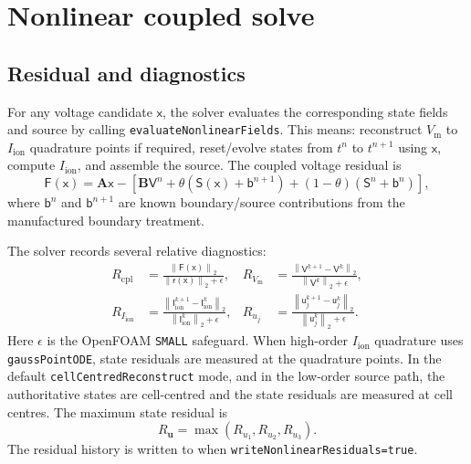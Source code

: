 \documentclass[11pt,a4paper]{article}
\newcommand{\code}[1]{\texttt{\small #1}}
\newcommand{\Vm}{V_{\text{m}}}
\newcommand{\Iion}{I_{\mathrm{ion}}}
\newcommand{\Aimp}{\mathbf{A}}
\newcommand{\Bimp}{\mathbf{B}}
\newcommand{\Fres}{\mathsf{F}}
\newcommand{\norm}[1]{\left\lVert #1 \right\rVert}
\begin{document}
\section{Nonlinear coupled solve}

\subsection{Residual and diagnostics}

For any voltage candidate $\mathsf{x}$, the solver evaluates the corresponding
state fields and source by calling \code{evaluateNonlinearFields}. This means:
reconstruct $\Vm$ to $\Iion$ quadrature points if required, reset/evolve states
from $t^n$ to $t^{n+1}$ using $\mathsf{x}$, compute $\Iion$, and assemble the
source. The coupled voltage residual is
\begin{equation}
  \Fres(\mathsf{x})
  =
  \Aimp\mathsf{x}
  -
  \left[
    \Bimp\mathsf{V}^{n}
    +\theta\left(\mathsf{S}(\mathsf{x})+\mathsf{b}^{n+1}\right)
    +(1-\theta)\left(\mathsf{S}^{n}+\mathsf{b}^{n}\right)
  \right],
  \label{eq:nonlinear-residual}
\end{equation}
where $\mathsf{b}^{n}$ and $\mathsf{b}^{n+1}$ are known boundary/source
contributions from the manufactured boundary treatment.

The solver records several relative diagnostics:
\begin{align}
  R_{\mathrm{cpl}} &=
  \frac{\norm{\Fres(\mathsf{x})}_2}
       {\norm{\mathsf{r}(\mathsf{x})}_2+\epsilon},
  &
  R_{\Vm} &=
  \frac{\norm{\mathsf{V}^{k+1}-\mathsf{V}^{k}}_2}
       {\norm{\mathsf{V}^{k}}_2+\epsilon},\\
  R_{\Iion} &=
  \frac{\norm{\mathsf{I}^{k+1}_{\mathrm{ion}}-\mathsf{I}^{k}_{\mathrm{ion}}}_2}
       {\norm{\mathsf{I}^{k}_{\mathrm{ion}}}_2+\epsilon},
  &
  R_{u_j} &=
  \frac{\norm{\mathsf{u}^{k+1}_{j}-\mathsf{u}^{k}_{j}}_2}
       {\norm{\mathsf{u}^{k}_{j}}_2+\epsilon}.
\end{align}
Here $\epsilon$ is the OpenFOAM \code{SMALL} safeguard. When high-order
$\Iion$ quadrature uses \code{gaussPointODE}, state residuals are measured at
the quadrature points. In the default \code{cellCentredReconstruct} mode, and
in the low-order source path, the authoritative states are cell-centred and
the state residuals are measured at cell centres. The maximum state residual
is
\begin{equation}
  R_{\mathbf{u}}=\max(R_{u_1},R_{u_2},R_{u_3}).
\end{equation}
The residual history is written to
when \code{writeNonlinearResiduals=true}.
\end{document}
